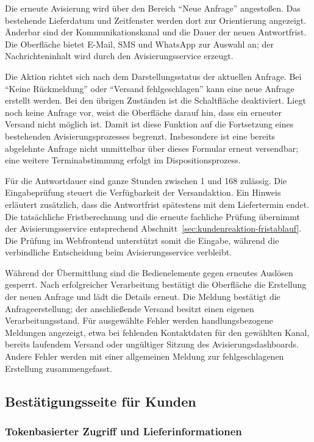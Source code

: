 Die erneute Avisierung wird über den Bereich \enquote{Neue Anfrage} angestoßen. Das bestehende
Lieferdatum und Zeitfenster werden dort zur Orientierung angezeigt. Änderbar sind der
Kommunikationskanal und die Dauer der neuen Antwortfrist. Die Oberfläche bietet E-Mail, SMS und
WhatsApp zur Auswahl an; der Nachrichteninhalt wird durch den Avisierungsservice erzeugt.

Die Aktion richtet sich nach dem Darstellungsstatus der aktuellen Anfrage. Bei \enquote{Keine
Rückmeldung} oder \enquote{Versand fehlgeschlagen} kann eine neue Anfrage erstellt werden. Bei
den übrigen Zuständen ist die Schaltfläche deaktiviert. Liegt noch keine Anfrage vor, weist die
Oberfläche darauf hin, dass ein erneuter Versand nicht möglich ist. Damit ist diese Funktion
auf die Fortsetzung eines bestehenden Avisierungsprozesses begrenzt. Insbesondere ist eine
bereits abgelehnte Anfrage nicht unmittelbar über dieses Formular erneut versendbar; eine
weitere Terminabstimmung erfolgt im Dispositionsprozess.

Für die Antwortdauer sind ganze Stunden zwischen 1 und 168 zulässig. Die Eingabeprüfung steuert
die Verfügbarkeit der Versandaktion. Ein Hinweis erläutert zusätzlich, dass die Antwortfrist
spätestens mit dem Liefertermin endet. Die tatsächliche Fristberechnung und die erneute
fachliche Prüfung übernimmt der Avisierungsservice entsprechend
Abschnitt~\ref{sec:kundenreaktion-fristablauf}. Die Prüfung im Webfrontend unterstützt somit
die Eingabe, während die verbindliche Entscheidung beim Avisierungsservice verbleibt.

Während der Übermittlung sind die Bedienelemente gegen erneutes Auslösen gesperrt. Nach
erfolgreicher Verarbeitung bestätigt die Oberfläche die Erstellung der neuen Anfrage und lädt
die Details erneut. Die Meldung bestätigt die Anfrageerstellung; der anschließende Versand
besitzt einen eigenen Verarbeitungsstand. Für ausgewählte Fehler werden handlungsbezogene
Meldungen angezeigt, etwa bei fehlenden Kontaktdaten für den gewählten Kanal, bereits laufendem
Versand oder ungültiger Sitzung des Avisierungsdashboards. Andere Fehler werden mit einer
allgemeinen Meldung zur fehlgeschlagenen Erstellung zusammengefasst.

\subsection{Bestätigungsseite für Kunden}

\subsubsection{Tokenbasierter Zugriff und Lieferinformationen}

